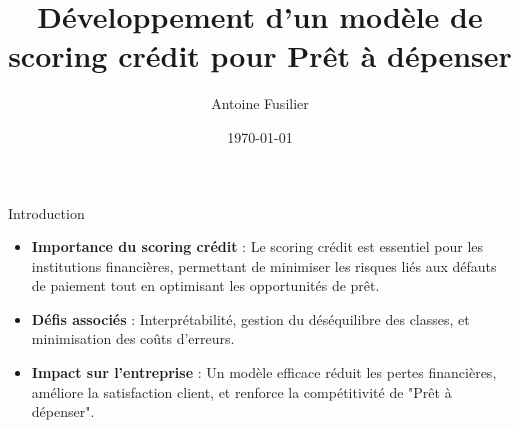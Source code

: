 \documentclass{beamer}
\title{Développement d'un modèle de scoring crédit pour Prêt à dépenser}
\author{Antoine Fusilier}
\institute{Prêt à dépenser}
\date{\today}
\begin{document}
\small
\begin{frame}
    \titlepage
\end{frame}

\begin{frame}{Introduction}
    \begin{itemize}
        \item \textbf{Importance du scoring crédit} : Le scoring crédit est essentiel pour les institutions financières, permettant de minimiser les risques liés aux défauts de paiement tout en optimisant les opportunités de prêt.
        \item \textbf{Défis associés} : Interprétabilité, gestion du déséquilibre des classes, et minimisation des coûts d'erreurs.
        \item \textbf{Impact sur l'entreprise} : Un modèle efficace réduit les pertes financières, améliore la satisfaction client, et renforce la compétitivité de "Prêt à dépenser".
    \end{itemize}
\end{frame}
\end{document}
